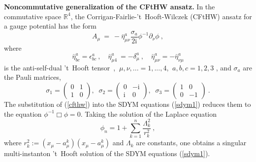 \documentclass[a4paper,11pt]{article}
\numberwithin{equation}{section}
\def\de{\delta}
\def\e{\epsilon}
\def\p{\phi}
\def\s{\sigma}
\def\m{\mu}
\def\n{\nu}
\def\pa{\partial}
\newcommand{\im}{\mathrm{i}}
\newcommand{\rc}{{\mathbb{R}^4}}
\begin{document}
{\bf Noncommutative generalization of the CFtHW ansatz.}
In the commutative space $\rc$, the Corrigan-Fairlie-'t~Hooft-Wilczek (CFtHW) 
ansatz for a gauge potential has the form
\begin{equation}\label{cfthw}
A_\mu\ =\  - \bar\eta^a_{\mu\nu}\frac{\s_a}{2\im}
\p^{-1}\pa_\nu\p \ ,
\end{equation}
where
\begin{equation}
\bar\eta^a_{bc}=\e^a_{bc}\ ,\quad  
\bar\eta^a_{\m 4}\ =-\de^a_\mu\ , \quad 
\bar\eta^a_{\m \n}=-\bar\eta^a_{\n \m}
\end{equation}
is the anti-self-dual 't~Hooft tensor~\cite{Prasad:1980yy},
$\ \mu , \nu ,... =1,...,4$, $\ a,b,c=1,2,3$ ,
and $\sigma_a$ are 
the Pauli matrices,
\begin{equation}
\sigma_1=
\left( \begin{array}{rr} %
      0 & 1  \\ 1 & 0  
\end{array}\right), \; \;
\sigma_2=
\left( \begin{array}{rr} %
        0 & -\im  \\ \im & 0  
\end{array}\right), \; \;
\sigma_3=
\left( \begin{array}{rr} %
        1 & 0  \\ 0 & -1 
\end{array}\right)\ .
\label{pauli}
\end{equation}
The substitution of (\ref{cfthw}) into the SDYM equations (\ref{sdym1})
reduces them to the equation $\p^{-1}\Box\p =0$.
Taking the solution of the Laplace equation
\begin{equation}\label{laplsol}
\phi_n = 1+\sum^n_{k=1}\frac{\Lambda^2_k}{r^2_k}\ ,
\end{equation}
where $r^2_k:=(x_\m-a^k_\m)(x_\m-a^k_\m)$ and $\Lambda_k$ are constants,  
one obtains a singular multi-instanton 't~Hooft solution of the SDYM 
equations (\ref{sdym1}).
\end{document}
